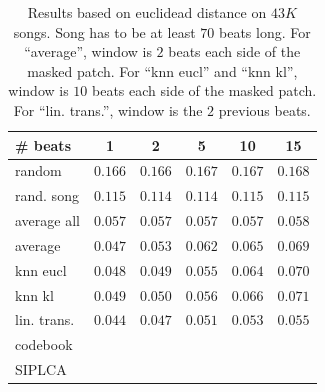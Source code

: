 \documentclass{article}
\begin{document}
\begin{table}[t]
\begin{small}
\begin{center}
\begin{tabular}{l|c|c|c|c|c|}
\# beats  & 1 & 2 & 5 & 10 & 15 \\ \hline \hline
random & $0.166$ & $0.166$ & $0.167$ & $0.167$ & $0.168$  \\
rand. song & $0.115$ & $0.114$ & $0.114$ & $0.115$ & $0.115$  \\
average all & $0.057$ & $0.057$ & $0.057$ & $0.057$ & $0.058$ \\
average & $0.047$ & $0.053$ & $0.062$ & $0.065$ & $0.069$ \\ \hline
knn eucl & $0.048$ & $0.049$ & $0.055$ & $0.064$ &  $0.070$ \\
knn kl & $0.049$ & $0.050$ & $0.056$ & $0.066$ &  $0.071$ \\
lin. trans. & $\mathbf{0.044}$ & $\mathbf{0.047}$ & $\mathbf{0.051}$ & $\mathbf{0.053}$ & $\mathbf{0.055}$ \\
codebook & & & & &  \\
SIPLCA & & & & &  \\ \hline
\end{tabular}
\caption{Results based on euclidead distance on $43K$ songs.
Song has to be at least $70$ beats long. 
For ``average'', window is $2$ beats each side of the masked patch.
For ``knn eucl'' and ``knn kl'', window is $10$ beats each side of the masked patch.
For ``lin. trans.'', window is the $2$ previous beats.}
\label{tab:reseucl}
\end{center}
\end{small}
\end{table}
\end{document}
